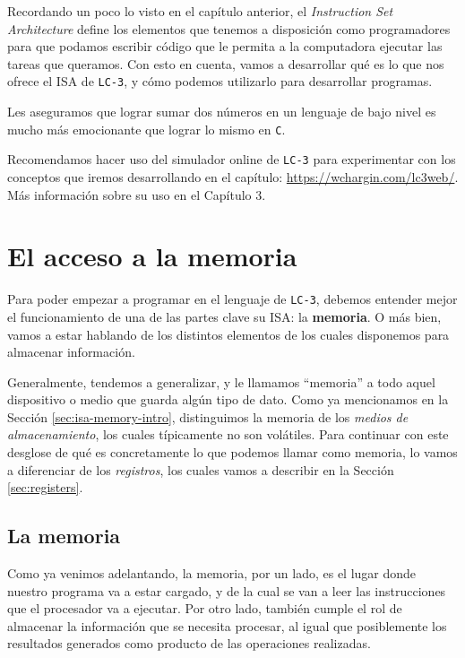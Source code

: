 \documentclass[a4paper, titlepage]{report}
\begin{document}
	Recordando un poco lo visto en el capítulo anterior, el \textit{Instruction Set Architecture} define los elementos que tenemos a disposición como programadores para que podamos escribir código que le permita a la computadora ejecutar las tareas que queramos. Con esto en cuenta, vamos a desarrollar qué es lo que nos ofrece el ISA de \texttt{LC-3}, y cómo podemos utilizarlo para desarrollar programas.
	
	Les aseguramos que lograr sumar dos números en un lenguaje de bajo nivel es mucho más emocionante que lograr lo mismo en \texttt{C}.
	
	Recomendamos hacer uso del simulador online de \texttt{LC-3} para experimentar con los conceptos que iremos desarrollando en el capítulo: \url{https://wchargin.com/lc3web/}. Más información sobre su uso en el Capítulo 3.
	
	\section{El acceso a la memoria}
	
	Para poder empezar a programar en el lenguaje de \texttt{LC-3}, debemos entender mejor el funcionamiento de una de las partes clave su ISA: la \textbf{memoria}. O más bien, vamos a estar hablando de los distintos elementos de los cuales disponemos para almacenar información.
	
	Generalmente, tendemos a generalizar, y le llamamos ``memoria'' a todo aquel dispositivo o medio que guarda algún tipo de dato. Como ya mencionamos en la Sección \ref{sec:isa-memory-intro}, distinguimos la memoria de los \textit{medios de almacenamiento}, los cuales típicamente no son volátiles. Para continuar con este desglose de qué es concretamente lo que podemos llamar como memoria, lo vamos a diferenciar de los \textit{registros}, los cuales vamos a describir en la Sección \ref{sec:registers}.
	
	\subsection{La memoria}
	
	Como ya venimos adelantando, la memoria, por un lado, es el lugar donde nuestro programa va a estar cargado, y de la cual se van a leer las instrucciones que el procesador va a ejecutar. Por otro lado, también cumple el rol de almacenar la información que se necesita procesar, al igual que posiblemente los resultados generados como producto de las operaciones realizadas.
	
\end{document}
